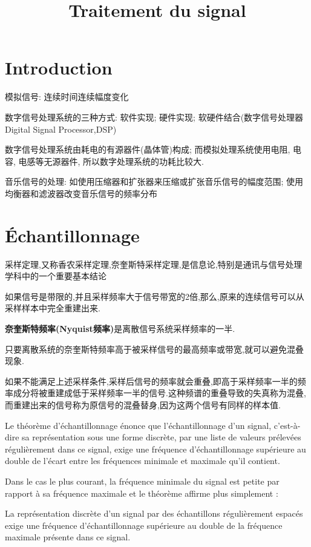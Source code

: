 \documentclass{article}
\begin{document}
\title{Traitement du signal}
\maketitle
\tableofcontents
\newpage

\section{Introduction}
模拟信号: 连续时间连续幅度变化

数字信号处理系统的三种方式: 软件实现; 硬件实现; 软硬件结合(数字信号处理器Digital Signal Processor,DSP)

数字信号处理系统由耗电的有源器件(晶体管)构成; 而模拟处理系统使用电阻, 电容, 电感等无源器件, 所以数字处理系统的功耗比较大.

音乐信号的处理:  
如使用压缩器和扩张器来压缩或扩张音乐信号的幅度范围;
使用均衡器和滤波器改变音乐信号的频率分布

\section{\'Echantillonnage}
采样定理,又称香农采样定理,奈奎斯特采样定理,是信息论,特别是通讯与信号处理学科中的一个重要基本结论

如果信号是带限的,并且采样频率大于信号带宽的2倍,那么,原来的连续信号可以从采样样本中完全重建出来.

\textbf{奈奎斯特频率(Nyquist频率)}是离散信号系统采样频率的一半.

只要离散系统的奈奎斯特频率高于被采样信号的最高频率或带宽,就可以避免混叠现象.

如果不能满足上述采样条件,采样后信号的频率就会重叠,即高于采样频率一半的频率成分将被重建成低于采样频率一半的信号.这种频谱的重叠导致的失真称为混叠,而重建出来的信号称为原信号的混叠替身,因为这两个信号有同样的样本值.

Le th\'eor\`eme d'\'echantillonnage \'enonce que l'\'echantillonnage d'un signal, c'est-\`a-dire sa repr\'esentation sous une forme discr\`ete, par une liste de valeurs pr\'elev\'ees r\'eguli\`erement dans ce signal, exige une fr\'equence d'\'echantillonnage sup\'erieure au double de l'\'ecart entre les fr\'equences minimale et maximale qu'il contient.

Dans le cas le plus courant, la fr\'equence minimale du signal est petite par rapport \`a sa fr\'equence maximale et le th\'eor\`eme affirme plus simplement :

La repr\'esentation discr\`ete d'un signal par des \'echantillons r\'eguli\`erement espac\'es exige une fr\'equence d'\'echantillonnage sup\'erieure au double de la fr\'equence maximale pr\'esente dans ce signal.
\end{document}
